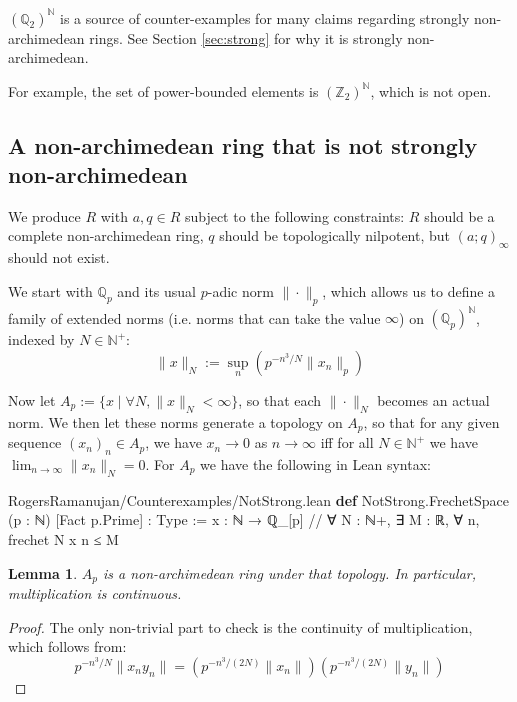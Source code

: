 \documentclass[12pt]{amsart}
\newtheorem{lemma}[theorem]{Lemma}
\theoremstyle{definition}
\theoremstyle{remark}
\numberwithin{equation}{subsection}
\newcommand{\N}{\mathbb N}
\newcommand{\Q}{\mathbb Q}
\newcommand{\Z}{\mathbb Z}
\newcommand{\kw}[1]{\textcolor{keywordcolor}{\textbf{#1}}}
\newcommand{\var}[1]{\textcolor{tacticcolor}{#1}}
\newcommand{\prop}[1]{\textcolor{sortcolor}{#1}}
\newcommand{\imp}[1]{\textcolor{commentcolor}{\textbraceleft#1\textbraceright}}
\begin{document}
$(\Q_2)^\N$ is a source of counter-examples for many claims regarding strongly non-archimedean rings. See Section \ref{sec:strong} for why it is strongly non-archimedean.

For example, the set of power-bounded elements is $(\Z_2)^\N$, which is not open.

\subsection{A non-archimedean ring that is not strongly non-archimedean}

We produce $R$ with $a, q \in R$ subject to the following constraints: $R$ should be a complete non-archimedean ring, $q$ should be topologically nilpotent, but $(a; q)_\infty$ should not exist.

We start with $\Q_p$ and its usual $p$-adic norm $\|\cdot\|_p$, which allows us to define a family of extended norms (i.e. norms that can take the value $\infty$) on $(\Q_p)^\N$, indexed by $N \in \N^+$:
\begin{equation}\|x\|_N := \sup_{n} \left( p^{-n^3/N} \|x_n\|_p \right)\end{equation}

Now let $A_p := \{x \mid \forall N, \|x\|_N < \infty\}$, so that each $\|\cdot\|_N$ becomes an actual norm. We then let these norms generate a topology on $A_p$, so that for any given sequence $(x_n)_n \in A_p$, we have $x_n \to 0$ as $n \to \infty$ iff for all $N \in \N^+$ we have $\lim_{n \to \infty} \|x_n\|_N = 0$. For $A_p$ we have the following in Lean syntax:

\begin{code}{RogersRamanujan/Counterexamples/NotStrong.lean}
\kw{def} NotStrong.FrechetSpace (\var{p} : ℕ) [Fact \var{p}.\prop{Prime}] : Type :=
  \imp{ \var{x} : ℕ → ℚ_[\var{p}] // ∀ \var{N} : ℕ+, ∃ \var{M} : ℝ, ∀ \var{n}, frechet \var{N} \var{x} \var{n} ≤ \var{M} }
\end{code}

\begin{lemma}
    $A_p$ is a non-archimedean ring under that topology. In particular, multiplication is continuous.
\end{lemma}
\begin{proof}
    The only non-trivial part to check is the continuity of multiplication, which follows from:
    \begin{equation}
        p^{-n^3/N} \|x_n y_n\| = \left( p^{-n^3/(2N)} \|x_n\| \right) \left( p^{-n^3/(2N)} \|y_n\| \right)
    \end{equation}
\end{proof}
\end{document}
